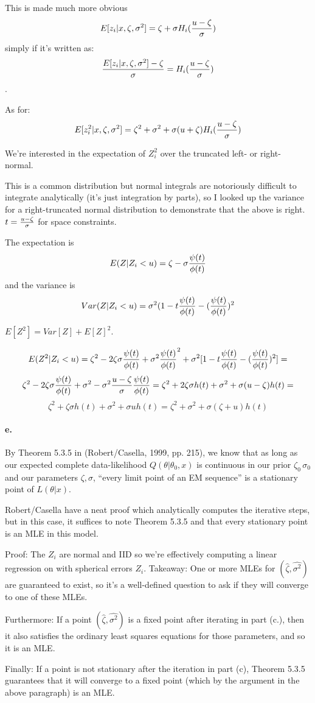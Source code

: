 \documentclass{article}
\begin{document}
This is made much more obvious
\[E[z_i \vert x, \zeta, \sigma^2] = \zeta + \sigma H_i({u - \zeta \over \sigma})\]
simply if it's written as:
\[{E[z_i \vert x, \zeta, \sigma^2] - \zeta \over \sigma} = H_i({u - \zeta \over \sigma})\].

As for:
\[E[z_i^2 \vert x, \zeta, \sigma^2] = \zeta^2 + \sigma^2 + \sigma (u + \zeta) H_i({u - \zeta \over \sigma})\]

We're interested in the expectation of \(Z_i^2\) over the truncated left- or right- normal.

This is a common distribution but normal integrals are notoriously difficult to integrate
analytically (it's just integration by parts), so I looked up the variance for
a right-truncated normal distribution to demonstrate that the above is right.
\(t = {u - \zeta \over \sigma}\) for space constraints.

The expectation is \[E(Z \vert Z_i < u) = \zeta - \sigma {\psi(t)\over \phi(t)}\]
and the variance is \[Var(Z \vert Z_i < u) = \sigma^2(1 - t{\psi(t)\over \phi(t)} - ({\psi(t)\over \phi(t)})^2\]

\(E[Z^2] = Var[Z] + E[Z]^2\).

\[E(Z^2 \vert Z_i < u) = \zeta^2 - 2\zeta\sigma {\psi(t)\over \phi(t)} + \sigma^2 {\psi(t)\over \phi(t)}^2
+  \sigma^2[1 - t{\psi(t)\over \phi(t)} - ({\psi(t)\over \phi(t)})^2] = \]
\[ \zeta^2 - 2\zeta\sigma {\psi(t)\over \phi(t)} 
+  \sigma^2 - \sigma^2{u - \zeta \over \sigma}{\psi(t)\over \phi(t)} = 
\zeta^2 + 2\zeta\sigma h(t) 
+  \sigma^2 + \sigma(u - \zeta)h(t) = \]
\[\zeta^2 + \zeta\sigma h(t) 
+  \sigma^2 + \sigma u h(t) = \zeta^2 + \sigma^2 + \sigma (\zeta + u) h(t)\]

\paragraph{e.}

By Theorem 5.3.5 in (Robert/Casella, 1999, pp. 215), we know that as long as our
expected complete data-likelihood \(Q(\theta \vert \theta_0, x)\) is continuous in our prior \(\zeta_0\, \sigma_0\) and
our parameters \(\zeta, \sigma\), ``every limit point of an EM sequence'' is a stationary point of \(L(\theta \vert x)\).

Robert/Casella have a neat proof which analytically computes the iterative steps, but in this case,
it suffices to note Theorem 5.3.5 and that every stationary point is an MLE in this model.

Proof: The \(Z_i\) are normal and IID so we're effectively computing a linear regression on
with spherical errors \(Z_i\). Takeaway: One or more MLEs for \((\hat{\zeta}, \hat{\sigma^2})\)
are guaranteed to exist, so it's a well-defined question to ask if they will converge
to one of these MLEs.

Furthermore: If a point \((\hat{\zeta}, \hat{\sigma^2})\) is a fixed point after iterating in part (c.),
then it also satisfies the ordinary least squares equations for those parameters, and so it is an MLE.

Finally: If a point is not stationary after the iteration in part (c), Theorem 5.3.5 guarantees that
it will converge to a fixed point (which by the argument in the above paragraph) is an MLE.
\end{document}
